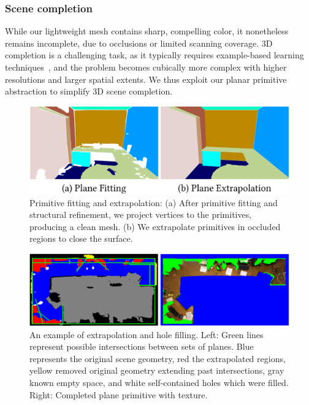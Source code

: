 \subsubsection{Scene completion}
\label{sec:completion}

While our lightweight mesh contains sharp, compelling color, it nonetheless remains incomplete, due to occlusions or limited scanning coverage.
3D completion is a challenging task, as it typically requires example-based learning techniques~\cite{dai2017complete}, and the problem becomes cubically more complex with higher resolutions and larger spatial extents.
We thus exploit our planar primitive abstraction to simplify 3D scene completion.%
\begin{figure}
    \centering
    \includegraphics[width=0.8\linewidth]{3dlite/fig7.png}
    \caption{Primitive fitting and extrapolation: (a) After primitive fitting and structural refinement, we project vertices to the primitives, producing a clean mesh. (b) We extrapolate primitives in occluded regions to close the surface.}
    \label{fig:3dlite-plane-fit}
\end{figure}

\label{subsec:3dlite-extrapolate}
\begin{figure}
    \centering
    \includegraphics[width=0.8\linewidth]{3dlite/fig9.png}
    \caption{An example of extrapolation and hole filling. Left: Green lines represent possible intersections between sets of planes. Blue represents the original scene geometry, red the extrapolated regions, yellow removed original geometry extending past intersections, gray known empty space, and white self-contained holes which were filled. Right: Completed plane primitive with texture.}
    \label{fig:3dlite-plane-fill}
\end{figure}

